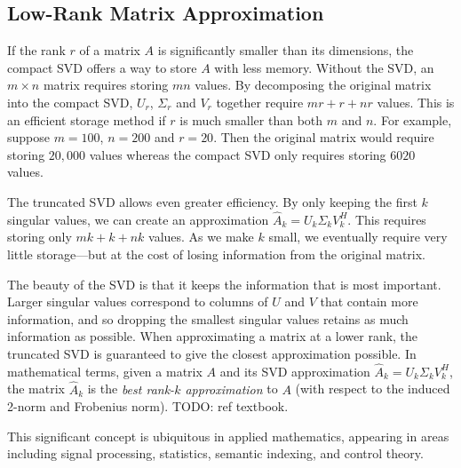 \subsection*{Low-Rank Matrix Approximation}
If the rank $r$ of a matrix $A$ is significantly smaller than its dimensions, the compact SVD offers a way to store $A$ with less memory.
Without the SVD, an $m\times n$ matrix requires storing $mn$ values.
By decomposing the original matrix into the compact SVD, $U_r$, $\Sigma_r$ and $V_r$ together require $mr+r+nr$ values.
This is an efficient storage method if $r$ is much smaller than both $m$ and $n$.
For example, suppose $m=100$, $n=200$ and $r=20$.
Then the original matrix would require storing $20,000$ values whereas the compact SVD only requires storing $6020$ values.

The truncated SVD allows even greater efficiency.
By only keeping the first $k$ singular values, we can create an approximation $\widehat A_k = U_k\Sigma_k V_k^H$.
This requires storing only $mk+k+nk$ values.
As we make $k$ small, we eventually require very little storage---but at the cost of losing information from the original matrix.

The beauty of the SVD is that it keeps the information that is most important. 
Larger singular values correspond to columns of $U$ and $V$ that contain more information, and so dropping the smallest singular values retains as much information as possible.
When approximating a matrix at a lower rank, the truncated SVD is guaranteed to give the closest approximation possible.
In mathematical terms, given a matrix $A$ and its SVD approximation $\widehat A_k = U_k\Sigma_k V_k^H$, the matrix $\widehat A_k$ is the \emph{best rank-$k$ approximation} to $A$ (with respect to the induced 2-norm and Frobenius norm). TODO: ref textbook.

This significant concept is ubiquitous in applied mathematics, appearing in areas including signal processing, statistics, semantic indexing, and control theory.

